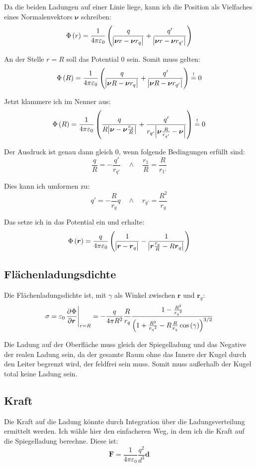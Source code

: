 \documentclass[11pt, ngerman, fleqn]{article}
\renewcommand{\vec}[1]{\boldsymbol{#1}}
\begin{document}
Da die beiden Ladungen auf einer Linie liege, kann ich die Position als Vielfaches eines Normalenvektors $\vec \nu$ schreiben:
\[
	\Phi\del{r} = \frac{1}{4 \pi \varepsilon_0} \del{
		\frac{q}{\abs{\vec \nu r - \vec \nu r_q}}
		+
		\frac{q'}{\abs{\vec \nu r - \vec \nu r_{q'}}}
	}
\]

An der Stelle $r = R$ soll das Potential 0 sein. Somit muss gelten:
\[
	\Phi\del{R} = \frac{1}{4 \pi \varepsilon_0} \del{
		\frac{q}{\abs{\vec \nu R - \vec \nu r_q}}
		+
		\frac{q'}{\abs{\vec \nu R - \vec \nu r_{q'}}}
	}
	\overset != 0
\]

Jetzt klammere ich im Nenner aus:
\[
	\Phi\del{R} = \frac{1}{4 \pi \varepsilon_0} \del{
		\frac{q}{R \abs{\vec \nu - \vec \nu \frac{r_q}R}}
		+
		\frac{q'}{r_{q'} \abs{\vec \nu \frac{ R}{r_{q'}} - \vec \nu}}
	}
	\overset != 0
\]

Der Ausdruck ist genau dann gleich 0, wenn folgende Bedingungen erfüllt sind:
\[
	\frac qR = - \frac{q'}{r_{q'}}
	\quad\wedge\quad
	\frac{r_1}R = \frac R{r_{1'}}
\]

Dies kann ich umformen zu:
\[
	q' = - \frac R{r_q} q
	\quad\wedge\quad
	r_{q'} = \frac{R^2}{r_q}
\]

Das setze ich in das Potential ein und erhalte:
\[
	\Phi\del{\vec r} = \frac{q}{4 \pi \varepsilon_0} \del{
		\frac{1}{\abs{\vec r - \vec r_q}}
		-
		\frac{1}{\abs{\vec r \frac{r_q}R - R \vec r_{q}}}
	}
\]

\subsection{Flächenladungsdichte}

Die Flächenladungsdichte ist, mit $\gamma$ als Winkel zwischen $\vec r$ und $\vec r_q$:
\[
	\sigma = \varepsilon_0 \eval{\dpd\Phi{\vec r}}_{r=R} = - \frac{q}{4 \pi R^2} \frac R{r_q} \frac{1 - \frac{R^2}{{r_q}^2}}{\del{1 + \frac{R^2}{{r_q}^2} - R \frac R{r_q} \cos\del\gamma}^{3/2}}
\]

Die Ladung auf der Oberfläche muss gleich der Spiegelladung und das Negative
der realen Ladung sein, da der gesamte Raum ohne das Innere der Kugel durch den
Leiter begrenzt wird, der feldfrei sein muss. Somit muss außerhalb der Kugel
total keine Ladung sein.

\subsection{Kraft}

Die Kraft auf die Ladung könnte durch Integration über die Ladungsverteilung ermittelt werden. Ich wähle hier den einfacheren Weg, in dem ich die Kraft auf die Spiegelladung berechne. Diese ist:
\[
	\vec F
	= \frac{1}{4 \pi \varepsilon_0} \frac{q^2}{d^3} \vec d
\]
\end{document}
